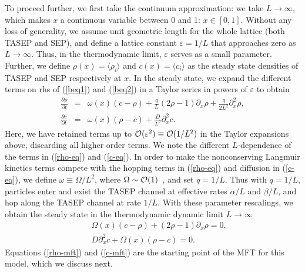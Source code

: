 \documentclass[aps,pre,twocolumn,superscriptaddress,amsmath,amssymb,longbibliography,floatfix]{revtex4}
\begin{document}
To proceed further, we first take the continuum approximation: we take $L\rightarrow \infty$, which makes $x$ a continuous variable between 0 and 1: $x\in [0,1]$. Without any loss of generality, we assume unit geometric length for the whole lattice (both TASEP and SEP), and define a lattice constant $\varepsilon = 1/L$ that approaches zero as $L\rightarrow \infty$. Thus, in the thermodynamic limit, $\varepsilon$ serves as a small parameter.  Further, we define $\rho(x)=\langle \rho_i\rangle$ and $c(x)=\langle c_i\rangle$ as the steady state densities of TASEP and SEP respectively at $x$. In the steady state, we expand the different terms on rhs of (\ref{beq1}) and (\ref{beq2}) in a Taylor series in powers of $\varepsilon$ to obtain
 \begin{eqnarray}
  \frac{\partial\rho}{\partial t}&=& \omega (x)(c-\rho)+ \frac{{q}}{L}(2\rho-1)\partial_x\rho + \frac{{q}}{2L^2}\partial_x^2 \rho,\label{rho-eq}\\
  \frac{\partial c}{\partial t}&=& \omega (x) (\rho-c)+ \frac{D}{L^2}\partial_x^2 c.\label{c-eq}
 \end{eqnarray}
Here, we have retained terms up to ${\cal O}(\varepsilon^2)\equiv {\cal O}(1/L^2)$ in the Taylor expansions above, discarding all higher order terms. We note the different $L$-dependence of the terms in (\ref{rho-eq}) and (\ref{c-eq}). {In order to make the nonconserving Langmuir kinetics terms compete with the hopping terms in (\ref{rho-eq}) and diffusion in (\ref{c-eq}), we define $\omega\equiv \Omega/L^2$, where $\Omega\sim {\cal O}(1)$~\cite{frey-lktasep}, and set $q=1/L$. Thus with $q=1/L$, particles enter and exist the TASEP channel at effective rates $\alpha/L$ and $\beta/L$, and hop along the TASEP channel at rate $1/L$.} With these parameter rescalings, we obtain the steady state in the thermodynamic dynamic limit $L\rightarrow\infty$
\begin{eqnarray}
 &&\Omega (x)(c-\rho)+(2\rho-1)\partial_x\rho =0,\label{rho-mft}\\
 && D\partial_x^2 c + \Omega (x) (\rho-c)=0. \label{c-mft}
\end{eqnarray}
Equations (\ref{rho-mft}) and (\ref{c-mft}) are the starting point of the MFT for this model, which we discuss next.
 

\end{document}
